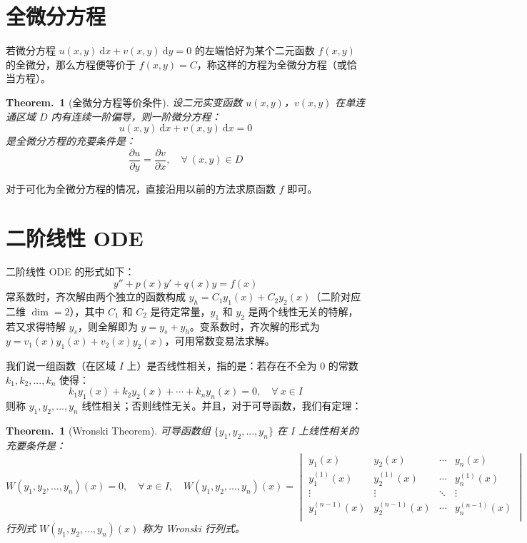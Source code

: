 \documentclass[UTF8]{report}
\theoremstyle{MyLineTheoremStyle} %
\theoremstyle{MyBlockTheoremStyle} %
\newtheorem{BlockTheorem}[LineTheorem]{Theorem.\,} %
\theoremstyle{MySubsubsectionStyle} %
\begin{document}
\section{全微分方程}
若微分方程 $u(x,y)\ \mathrm{d}x + v(x,y) \ \mathrm{d}y = 0$ 的左端恰好为某个二元函数 $f(x,y)$ 的全微分，那么方程便等价于 $f(x,y) = C$，称这样的方程为全微分方程（或恰当方程）。

\begin{BlockTheorem}[全微分方程等价条件]\label{全微分方程等价条件}
设二元实变函数 $u(x,y)$，$v(x,y)$ 在单连通区域 $D$ 内有连续一阶偏导，则一阶微分方程：
\begin{equation}
u(x,y) \ \mathrm{d}x + v(x,y) \ \mathrm{d}x = 0
\end{equation}
是全微分方程的充要条件是：
\begin{equation}
\frac{\partial u }{\partial y } = \frac{\partial v }{\partial x },\quad \forall\ (x,y) \in D
\end{equation}
\end{BlockTheorem}

对于可化为全微分方程的情况，直接沿用以前的方法求原函数 $f$ 即可。

\section{二阶线性 ODE}
二阶线性 ODE 的形式如下：
\begin{equation}
y'' + p(x)y' + q(x)y = f(x)
\end{equation}
常系数时，齐次解由两个独立的函数构成 $y_h = C_1 y_1(x) + C_2 y_2(x)$（二阶对应二维 $\dim = 2$），其中 $C_1$ 和 $C_2$ 是待定常量，$y_1$ 和 $y_2$ 是两个线性无关的特解，若又求得特解 $y_s$，则全解即为 $y = y_s + y_h$。变系数时，齐次解的形式为 $y = v_1(x)y_1(x) + v_2(x)y_2(x)$，可用常数变易法求解。

我们说一组函数（在区域 $I$ 上）是否线性相关，指的是：若存在不全为 0 的常数 $k_1, k_2, ..., k_n$ 使得：
\begin{equation}
k_1 y_1(x) + k_2 y_2(x) + \cdots + k_n y_n(x) = 0,\quad \forall\ x \in I
\end{equation}
则称 $y_1, y_2, ..., y_n$ 线性相关；否则线性无关。并且，对于可导函数，我们有定理：

\begin{BlockTheorem}[Wronski Theorem]\label{Wronski Theorem}
可导函数组 $\{y_1, y_2, ..., y_n\}$ 在 $I$ 上线性相关的充要条件是：
\begin{equation}
W(y_1, y_2, ..., y_n)(x) = 0,\quad \forall\ x \in I,\quad 
W(y_1, y_2, ..., y_n)(x) = \begin{vmatrix}
y_1(x) & y_2(x) & \cdots & y_n(x) \\
y_1^{(1)}(x) & y_2^{(1)}(x) & \cdots & y_n^{(1)}(x) \\
\vdots & \vdots & \ddots & \vdots \\
y_1^{(n-1)}(x) & y_2^{(n-1)}(x) & \cdots & y_n^{(n-1)}(x) \\
\end{vmatrix}
\end{equation}
行列式 $W(y_1, y_2, ..., y_n)(x)$ 称为 Wronski 行列式。
\end{BlockTheorem}
\end{document}
